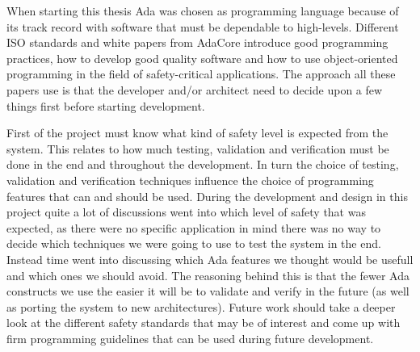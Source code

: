 When starting this thesis Ada was chosen as programming language because of its
track record with software that must be dependable to high-levels. Different
ISO standards and white papers from AdaCore introduce good programming
practices, how to develop good quality software and how to use object-oriented
programming in the field of safety-critical applications. The approach all
these papers use is that the developer and/or architect need to decide upon a
few things first before starting development.

First of the project must know what kind of safety level is expected from the
system. This relates to how much testing, validation and verification must
be done in the end and throughout the development. In turn the choice of
testing, validation and verification techniques influence the choice of
programming features that can and should be used. During the development and
design in this project quite a lot of discussions went into which level of
safety that was expected, as there were no specific application in mind
there was no way to decide which techniques we were going to use to test the
system in the end. Instead time went into discussing which Ada features we
thought would be usefull and which ones we should avoid. The reasoning
behind this is that the fewer Ada constructs we use the easier it will be to
validate and verify in the future (as well as porting the system to new
architectures). Future work should take a deeper look at the different safety
standards that may be of interest and come up with firm programming guidelines
that can be used during future development.

%
% 
% 

